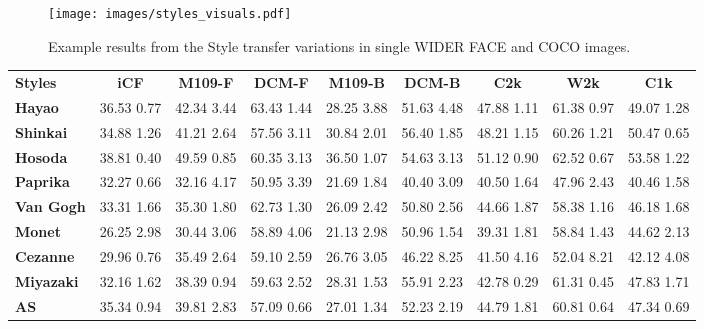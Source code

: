 \documentclass{article}
\begin{document}
\begin{figure*}[ht]
    \centering
    \texttt{[image: images/styles\_visuals.pdf]}
    \caption{Example results from the Style transfer variations in single WIDER FACE and COCO images.}
    \label{fig:styles_visuals}
\end{figure*}

\setlength{\tabcolsep}{4pt}
\begin{table*}
\centering
\begin{tabular}{l|ccc|ccccc}
    \hline
    \noalign{\smallskip}
    \textbf{Styles} & \textbf{iCF} & \textbf{M109-F} & \textbf{DCM-F} & \textbf{M109-B} & \textbf{DCM-B} & \textbf{C2k} & \textbf{W2k} & \textbf{C1k} \\
    \noalign{\smallskip}
    \hline
    \noalign{\smallskip}
    \textbf{Hayao}    & 36.53 {\tiny 0.77}&42.34 {\tiny 3.44}&63.43 {\tiny 1.44}&28.25 {\tiny 3.88}&51.63 {\tiny 4.48}&47.88 {\tiny 1.11}&61.38 {\tiny0.97}&49.07 {\tiny1.28} \\
    \textbf{Shinkai}  & 34.88 {\tiny 1.26}&41.21 {\tiny 2.64}&57.56 {\tiny 3.11}&30.84 {\tiny 2.01}& {56.40} {\tiny 1.85}&48.21 {\tiny 1.15}&60.26 {\tiny1.21}&50.47 {\tiny0.65} \\
    \textbf{Hosoda}   & 38.81 {\tiny 0.40}&49.59 {\tiny 0.85}&60.35 {\tiny 3.13}&36.50 {\tiny 1.07}&54.63 {\tiny 3.13}&51.12 {\tiny 0.90}&62.52 {\tiny0.67}&53.58 {\tiny1.22} \\
    \textbf{Paprika}  & 32.27 {\tiny 0.66}&32.16 {\tiny 4.17}&50.95 {\tiny 3.39}&21.69 {\tiny 1.84}&40.40 {\tiny 3.09}&40.50 {\tiny 1.64}&47.96 {\tiny2.43}&40.46 {\tiny1.58} \\
    \textbf{Van Gogh} & 33.31 {\tiny 1.66}&35.30 {\tiny 1.80}&{62.73} {\tiny 1.30}&26.09 {\tiny 2.42}&50.80 {\tiny 2.56}&44.66 {\tiny 1.87}&58.38 {\tiny1.16}&46.18 {\tiny1.68} \\
    \textbf{Monet}    & 26.25 {\tiny 2.98}&30.44 {\tiny 3.06}&58.89 {\tiny 4.06}&21.13 {\tiny 2.98}&50.96 {\tiny 1.54}&39.31 {\tiny 1.81}&58.84 {\tiny1.43}&44.62 {\tiny2.13} \\
    \textbf{Cezanne}  & 29.96 {\tiny 0.76}&35.49 {\tiny 2.64}&59.10 {\tiny 2.59}&26.76 {\tiny 3.05}&46.22 {\tiny 8.25}&41.50 {\tiny 4.16}&52.04 {\tiny8.21}&42.12 {\tiny4.08} \\
    \textbf{Miyazaki} & 32.16 {\tiny 1.62}&38.39 {\tiny 0.94}&59.63 {\tiny 2.52}&28.31 {\tiny 1.53}&55.91 {\tiny 2.23}&42.78 {\tiny 0.29}&61.31 {\tiny0.45}&47.83 {\tiny1.71} \\
    \textbf{AS}       & 35.34 {\tiny 0.94}&39.81 {\tiny 2.83}&57.09 {\tiny 0.66}&27.01 {\tiny 1.34}&52.23 {\tiny 2.19}&44.79 {\tiny 1.81}&60.81 {\tiny0.64}&47.34 {\tiny0.69} \\

\end{tabular}
\end{table*}
\end{document}
